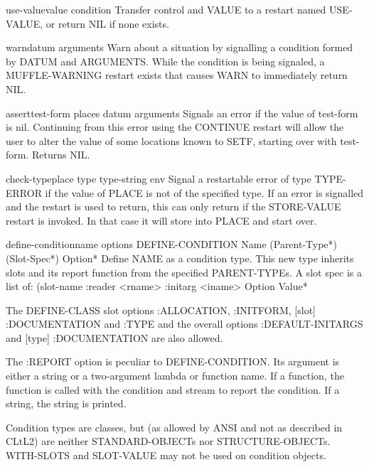 \documentclass[10pt,english]{book}
\begin{document}
\begin{function}{use-value}{value \op condition}
  Transfer control and VALUE to a restart named USE-VALUE, or return NIL if
   none exists.
\end{function}

\begin{function}{warn}{datum \rest arguments}
  Warn about a situation by signalling a condition formed by DATUM and
   ARGUMENTS. While the condition is being signaled, a MUFFLE-WARNING restart
   exists that causes WARN to immediately return NIL.
\end{function}

\begin{macro}{assert}{test-form \op places datum \rest arguments}
  Signals an error if the value of test-form is nil. Continuing from this
   error using the CONTINUE restart will allow the user to alter the value of
   some locations known to SETF, starting over with test-form. Returns NIL.
\end{macro}

\begin{macro}{check-type}{place type \op type-string \env env}
  Signal a restartable error of type TYPE-ERROR if the value of PLACE
is not of the specified type. If an error is signalled and the restart
is used to return, this can only return if the STORE-VALUE restart is
invoked. In that case it will store into PLACE and start over.
\end{macro}

\begin{macro}{define-condition}{name \rest \rest \body options}
  DEFINE-CONDITION Name (Parent-Type*) (Slot-Spec*) Option*
   Define NAME as a condition type. This new type inherits slots and its
   report function from the specified PARENT-TYPEs. A slot spec is a list of:
     (slot-name :reader <rname> :initarg <iname> {Option Value}*

   The DEFINE-CLASS slot options :ALLOCATION, :INITFORM, [slot] :DOCUMENTATION
   and :TYPE and the overall options :DEFAULT-INITARGS and
   [type] :DOCUMENTATION are also allowed.

   The :REPORT option is peculiar to DEFINE-CONDITION. Its argument is either
   a string or a two-argument lambda or function name. If a function, the
   function is called with the condition and stream to report the condition.
   If a string, the string is printed.

   Condition types are classes, but (as allowed by ANSI and not as described in
   CLtL2) are neither STANDARD-OBJECTs nor STRUCTURE-OBJECTs. WITH-SLOTS and
   SLOT-VALUE may not be used on condition objects.
\end{macro}
\end{document}
